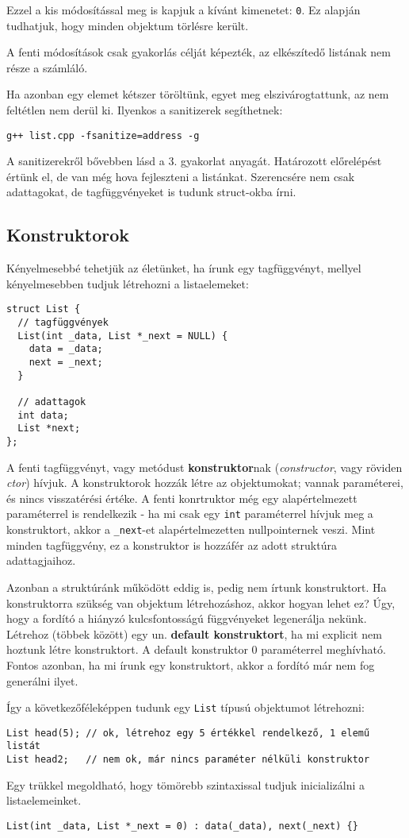 \documentclass[../cpp_book/cpp_book.tex]{subfiles}
\begin{document}
	Ezzel a kis módosítással meg is kapjuk a kívánt kimenetet: \texttt{0}. Ez alapján tudhatjuk, hogy minden objektum törlésre került.
	\begin{note}
		A fenti módosítások csak gyakorlás célját képezték, az elkészítedő listának nem része a számláló.
	\end{note}
	Ha azonban egy elemet kétszer töröltünk, egyet meg elszivárogtattunk, az nem feltétlen nem derül ki. Ilyenkos a sanitizerek segíthetnek:
	\begin{center}
		\texttt{g++ list.cpp -fsanitize=address -g}
	\end{center}
  A sanitizerekről bővebben lásd a 3. gyakorlat anyagát.
	\medskip
	Határozott előrelépést értünk el, de van még hova fejleszteni a listánkat. Szerencsére nem csak adattagokat, de tagfüggvényeket is tudunk struct-okba írni.
	\subsection{Konstruktorok}
	Kényelmesebbé tehetjük az életünket, ha írunk egy tagfüggvényt, mellyel kényelmesebben tudjuk létrehozni a listaelemeket:
	\begin{lstlisting}
struct List {
  // tagfüggvények
  List(int _data, List *_next = NULL) {
    data = _data;
    next = _next;
  }

  // adattagok
  int data;
  List *next;
};
	\end{lstlisting}
	A fenti tagfüggvényt, vagy metódust \textbf{konstruktor}nak (\textit{constructor}, vagy röviden \textit{ctor}) hívjuk. A konstruktorok hozzák létre az objektumokat; vannak paraméterei, és nincs visszatérési értéke. A fenti konrtruktor még egy alapértelmezett paraméterrel is rendelkezik - ha mi csak egy \texttt{int} paraméterrel hívjuk meg a konstruktort, akkor a \texttt{\_next}-et alapértelmezetten nullpointernek veszi. Mint minden tagfüggvény, ez a konstruktor is hozzáfér az adott struktúra adattagjaihoz.
	
	\medskip
	Azonban a struktúránk működött eddig is, pedig nem írtunk konstruktort. Ha konstruktorra szükség van objektum létrehozáshoz, akkor hogyan lehet ez? Úgy, hogy a fordító a hiányzó kulcsfontosságú függvényeket legenerálja nekünk. Létrehoz (többek között) egy un. \textbf{default konstruktort}, ha mi explicit nem hoztunk létre konstruktort. A default konstruktor 0 paraméterrel meghívható. Fontos azonban, ha mi írunk egy konstruktort, akkor a fordító már nem fog generálni ilyet.
	
	\medskip
	Így a következőféleképpen tudunk egy \texttt{List} típusú objektumot létrehozni:
	\begin{lstlisting}
List head(5); // ok, létrehoz egy 5 értékkel rendelkező, 1 elemű listát
List head2;   // nem ok, már nincs paraméter nélküli konstruktor
	\end{lstlisting}
	Egy trükkel megoldható, hogy tömörebb szintaxissal tudjuk inicializálni a listaelemeinket.
	\begin{lstlisting}
List(int _data, List *_next = 0) : data(_data), next(_next) {}
	\end{lstlisting}
	
\end{document}
